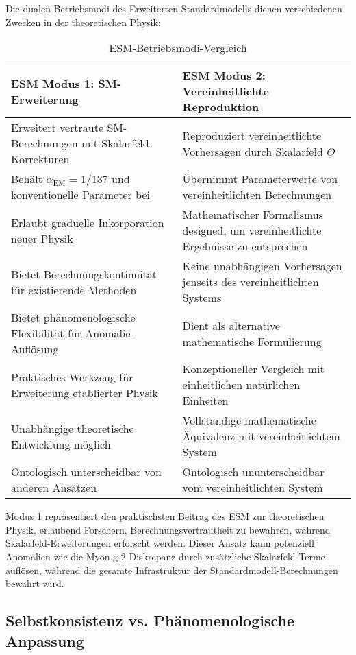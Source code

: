 \documentclass[12pt,a4paper]{article}
\newcommand{\alphaEM}{\alpha_{\text{EM}}}
\begin{document}
	Die dualen Betriebsmodi des Erweiterten Standardmodells dienen verschiedenen Zwecken in der theoretischen Physik:
	
	\begin{table}[ht]
		\centering
		\caption{ESM-Betriebsmodi-Vergleich}
		\label{tab:esm_modes_comparison}
		\begin{tabular}{p{}|p{}}
			\hline
			\textbf{ESM Modus 1: SM-Erweiterung} & \textbf{ESM Modus 2: Vereinheitlichte Reproduktion} \\
			\hline
			Erweitert vertraute SM-Berechnungen mit Skalarfeld-Korrekturen & Reproduziert vereinheitlichte Vorhersagen durch Skalarfeld $\Theta$ \\
			\hline
			Behält $\alphaEM = 1/137$ und konventionelle Parameter bei & Übernimmt Parameterwerte von vereinheitlichten Berechnungen \\
			\hline
			Erlaubt graduelle Inkorporation neuer Physik & Mathematischer Formalismus designed, um vereinheitlichte Ergebnisse zu entsprechen \\
			\hline
			Bietet Berechnungskontinuität für existierende Methoden & Keine unabhängigen Vorhersagen jenseits des vereinheitlichten Systems \\
			\hline
			Bietet phänomenologische Flexibilität für Anomalie-Auflösung & Dient als alternative mathematische Formulierung \\
			\hline
			Praktisches Werkzeug für Erweiterung etablierter Physik & Konzeptioneller Vergleich mit einheitlichen natürlichen Einheiten \\
			\hline
			Unabhängige theoretische Entwicklung möglich & Vollständige mathematische Äquivalenz mit vereinheitlichtem System \\
			\hline
			Ontologisch unterscheidbar von anderen Ansätzen & Ontologisch ununterscheidbar vom vereinheitlichten System \\
			\hline
		\end{tabular}
	\end{table}
	
	Modus 1 repräsentiert den praktischsten Beitrag des ESM zur theoretischen Physik, erlaubend Forschern, Berechnungsvertrautheit zu bewahren, während Skalarfeld-Erweiterungen erforscht werden. Dieser Ansatz kann potenziell Anomalien wie die Myon g-2 Diskrepanz durch zusätzliche Skalarfeld-Terme auflösen, während die gesamte Infrastruktur der Standardmodell-Berechnungen bewahrt wird.
	
	\subsection{Selbstkonsistenz vs. Phänomenologische Anpassung}
	\label{subsec:self_consistency_comparison}
	
\end{document}
